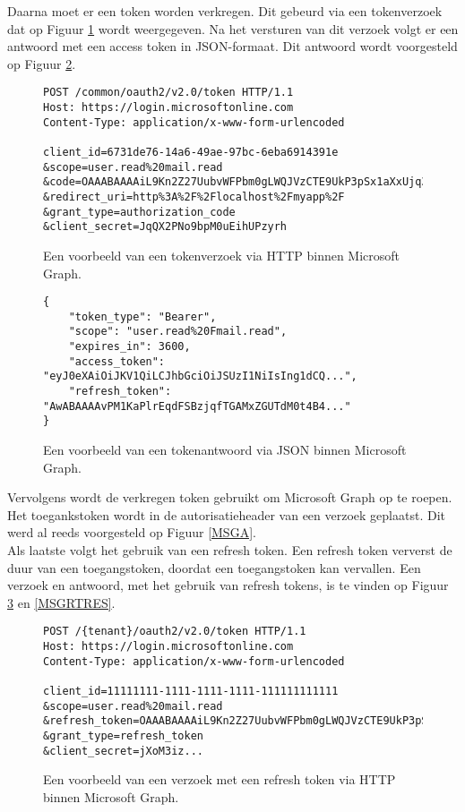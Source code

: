 Daarna moet er een token worden verkregen. Dit gebeurd via een tokenverzoek dat op Figuur \ref{HTR} wordt weergegeven. Na het versturen van dit verzoek volgt er een antwoord met een access token in \ac{JSON}-formaat. Dit antwoord wordt voorgesteld op Figuur \ref{HTRES}. \\ 

\begin{figure}[!h]
    \footnotesize\begin{verbatim}
POST /common/oauth2/v2.0/token HTTP/1.1
Host: https://login.microsoftonline.com
Content-Type: application/x-www-form-urlencoded
        
client_id=6731de76-14a6-49ae-97bc-6eba6914391e
&scope=user.read%20mail.read
&code=OAAABAAAAiL9Kn2Z27UubvWFPbm0gLWQJVzCTE9UkP3pSx1aXxUjq3n8b2JRLk4OxVXr...
&redirect_uri=http%3A%2F%2Flocalhost%2Fmyapp%2F
&grant_type=authorization_code
&client_secret=JqQX2PNo9bpM0uEihUPzyrh
    \end{verbatim}    
    \caption[Voorbeeld Token request Microsoft Graph]{Een voorbeeld van een tokenverzoek via \ac{HTTP} binnen Microsoft Graph.}
    \label{HTR}
\end{figure}

\begin{figure}[!h]
    \footnotesize\begin{verbatim}
{
    "token_type": "Bearer",
    "scope": "user.read%20Fmail.read",
    "expires_in": 3600,
    "access_token": "eyJ0eXAiOiJKV1QiLCJhbGciOiJSUzI1NiIsIng1dCQ...",
    "refresh_token": "AwABAAAAvPM1KaPlrEqdFSBzjqfTGAMxZGUTdM0t4B4..."
}        
    \end{verbatim}    
    \caption[Voorbeeld Token response Microsoft Graph]{Een voorbeeld van een tokenantwoord via \ac{JSON} binnen Microsoft Graph.}
    \label{HTRES}
\end{figure}

Vervolgens wordt de verkregen token gebruikt om Microsoft Graph op te roepen. Het toegankstoken wordt in de autorisatieheader van een verzoek geplaatst. Dit werd al reeds voorgesteld op Figuur \ref{MSGA}. \\

Als laatste volgt het gebruik van een refresh token. Een refresh token ververst de duur van een toegangstoken, doordat een toegangstoken kan vervallen. Een verzoek en antwoord, met het gebruik van refresh tokens, is te vinden op Figuur \ref{MSGRTR} en \ref{MSGRTRES}.

\begin{figure}[!h]
    \footnotesize\begin{verbatim}
POST /{tenant}/oauth2/v2.0/token HTTP/1.1
Host: https://login.microsoftonline.com
Content-Type: application/x-www-form-urlencoded

client_id=11111111-1111-1111-1111-111111111111
&scope=user.read%20mail.read
&refresh_token=OAAABAAAAiL9Kn2Z27UubvWFPbm0gLWQJVzCTE9UkP3pSx1aXxUjq...
&grant_type=refresh_token
&client_secret=jXoM3iz...   
    \end{verbatim}    
    \caption[Voorbeeld Refresh Token request Microsoft Graph]{Een voorbeeld van een verzoek met een refresh token via \ac{HTTP} binnen Microsoft Graph.}
    \label{MSGRTR}
\end{figure}

